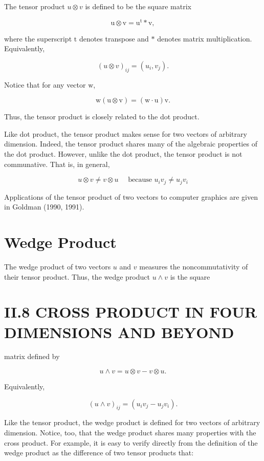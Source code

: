 \begin{CJK}{UTF8}{gbsn}
The tensor product $u \otimes v$ is defined to be the square matrix

$$
\mathrm{u} \otimes \mathrm{v}=\mathrm{u}^{\mathrm{t}} * \mathrm{v},
$$

where the superscript $\mathrm{t}$ denotes transpose and $*$ denotes matrix multiplication. Equivalently,

$$
(u \otimes v)_{i j}=\left(u_{i}, v_{j}\right) .
$$

Notice that for any vector $\mathrm{w}$,

$$
\mathrm{w}(\mathrm{u} \otimes \mathrm{v})=(\mathrm{w} \cdot \mathrm{u}) \mathrm{v} .
$$

Thus, the tensor product is closely related to the dot product.

Like dot product, the tensor product makes sense for two vectors of arbitrary dimension. Indeed, the tensor product shares many of the algebraic properties of the dot product. However, unlike the dot product, the tensor product is not communative. That is, in general,

$$
u \otimes v \neq v \otimes u \quad \text { because } u_{i} v_{j} \neq u_{j} v_{i}
$$

Applications of the tensor product of two vectors to computer graphics are given in Goldman (1990, 1991).

\section{Wedge Product}
The wedge product of two vectors $u$ and $v$ measures the noncommutativity of their tensor product. Thus, the wedge product $u \wedge v$ is the square

\section{II.8 CROSS PRODUCT IN FOUR DIMENSIONS AND BEYOND}
matrix defined by

$$
u \wedge v=u \otimes v-v \otimes u .
$$

Equivalently,

$$
(u \wedge v)_{i j}=\left(u_{i} v_{j}-u_{j} v_{i}\right) .
$$

Like the tensor product, the wedge product is defined for two vectors of arbitrary dimension. Notice, too, that the wedge product shares many properties with the cross product. For example, it is easy to verify directly from the definition of the wedge product as the difference of two tensor products that:


\end{CJK}
